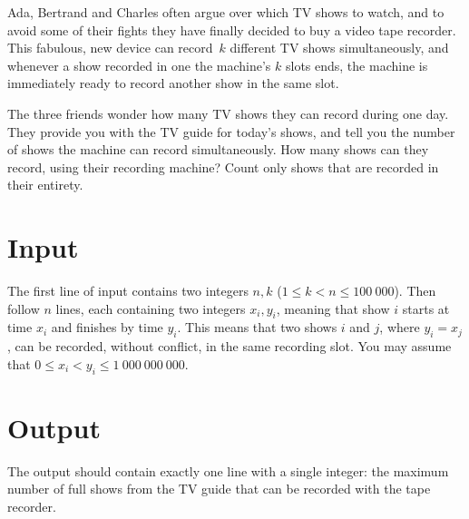 
Ada, Bertrand and Charles often argue over which TV shows to watch, and
to avoid some of their fights they have finally decided to buy a video
tape recorder. This fabulous, new device can record~$k$ different
TV shows simultaneously, and whenever a show recorded in one the machine's
$k$ slots ends, the machine is immediately ready to record another show in
the same slot.

The three friends wonder how many TV shows they can record during one day.
They provide you with the TV guide for today's shows, and tell you the number of
shows the machine can record simultaneously.
How many shows can they record, using their recording machine? Count only
shows that are recorded in their entirety.

\section*{Input}
The first line of input contains two integers $n,k$ ($1\leq k < n \leq
100\ 000$). Then follow $n$ lines, each containing two integers
$x_i,y_i$, meaning that show $i$ starts at time $x_i$ and finishes by
time $y_i$. This means that two shows $i$ and $j$, where $y_i = x_j$, can
be recorded, without conflict, in the same recording slot.
You may assume that $0 \leq x_{i}  < y_{i} \leq 1\ 000\ 000\ 000$.

\section*{Output}
The output should contain exactly one line with a single integer: the
maximum number of full shows from the TV guide that can be recorded
with the tape recorder.
